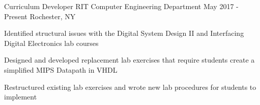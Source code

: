 \begin{cvexperiences}
	\cvexperience
		{Curriculum Developer}
		{RIT Computer Engineering Department}
		{May 2017 - Present}
		{Rochester, NY}
		{
			\begin{cvitems}
			\item {Identified structural issues with the Digital System Design II and Interfacing Digital Electronics lab courses}
			\item {Designed and developed replacement lab exercises that require students create a simplified MIPS Datapath in VHDL}
			\item {Restructured existing lab exercises and wrote new lab procedures for students to implement}
			\end{cvitems}
		}

\end{cvexperiences}
